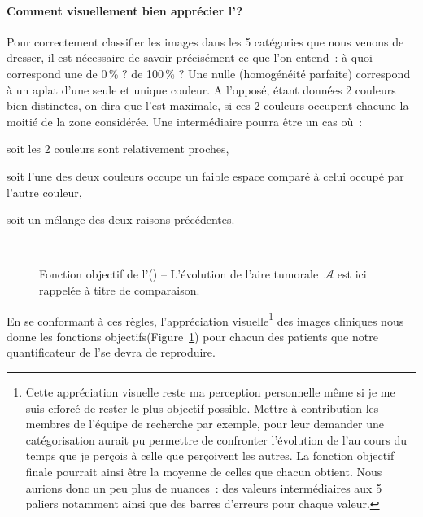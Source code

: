 \documentclass[main.tex]{subfiles}
\begin{document}
\paragraph{Comment visuellement bien apprécier l'\hetero ?}
Pour correctement classifier les images dans les 5 catégories que nous venons de dresser, il est nécessaire de savoir précisément ce que l'on entend~: à quoi correspond une \hetero de 0\,\% ? de 100\,\% ? Une \hetero nulle (\ie homogénéité parfaite) correspond à un aplat d'une seule et unique couleur. A l'opposé, étant données 2 couleurs bien distinctes, on dira que l'\hetero est maximale, si  ces 2 couleurs occupent chacune la moitié de la zone considérée. Une \hetero intermédiaire pourra être un cas où~:
\begin{myitemize}
\item soit les 2 couleurs sont relativement proches,
\item soit l'une des deux couleurs occupe un faible espace comparé à celui occupé par l'autre couleur, 
\item soit un mélange des deux raisons précédentes.
\end{myitemize}~
\begin{figure}
\caption{\label{fig:hetero_visuelle}Fonction objectif de l'\hetero (\!\!\HHobj) -- L'évolution de l'aire tumorale~$\mathcal{A}$ est ici rappelée à titre de comparaison.}
\end{figure}


En se conformant à ces règles, l'appréciation visuelle\footnote{\samepage Cette appréciation visuelle reste ma perception personnelle même si je me suis efforcé de rester le plus objectif possible. Mettre à contribution les membres de l'équipe de recherche par exemple, pour leur demander une catégorisation aurait pu permettre de confronter l'évolution de l'\hetero au cours du temps que je perçois à celle que perçoivent les autres. La fonction objectif finale pourrait ainsi être la moyenne de celles que chacun obtient. Nous aurions donc un peu plus de nuances~: des valeurs intermédiaires aux 5 paliers notamment ainsi que des barres d'erreurs pour chaque valeur.}
 des images cliniques nous donne les fonctions objectifs\HHobj (\cf Figure~\ref{fig:hetero_visuelle}) pour chacun des patients que notre quantificateur de l'\hetero se devra de reproduire. 
 
\end{document}
